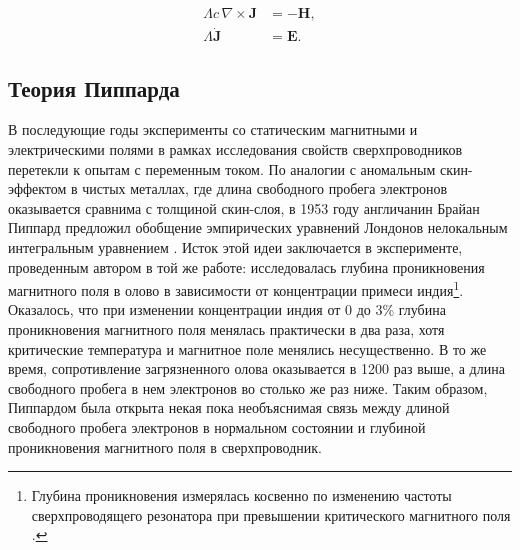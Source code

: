 \documentclass[14pt, a4paper]{extreport}
\numberwithin{equation}{section}
\begin{document}
\begin{align}
\Lambda c\, \nabla \times \mathbf J &= - \mathbf H,\\
\Lambda \dot{\mathbf J} &= \mathbf E.
\end{align}

\subsection{Теория Пиппарда}

В последующие годы эксперименты со статическим магнитными и электрическими полями в рамках исследования свойств сверхпроводников перетекли к опытам с переменным током. По аналогии с аномальным скин-эффектом в чистых металлах, где длина свободного пробега электронов оказывается сравнима с толщиной скин-слоя, в 1953 году англичанин Брайан Пиппард предложил обобщение эмпирических уравнений Лондонов нелокальным интегральным уравнением \cite{pippard1953experimental}. Исток этой идеи заключается в эксперименте, проведенным автором в той же работе: исследовалась глубина проникновения магнитного поля в олово в зависимости от концентрации примеси индия\footnote{Глубина проникновения измерялась косвенно по изменению частоты сверхпроводящего резонатора при превышении критического магнитного поля \cite{pippard1950surface}.}. Оказалось, что при изменении концентрации индия от 0  до 3\% глубина проникновения магнитного поля менялась практически в два раза, хотя критические температура и магнитное поле менялись несущественно. В то же время, сопротивление загрязненного олова оказывается в 1200 раз выше, а длина свободного пробега в нем электронов во столько же раз ниже. Таким образом, Пиппардом была открыта некая пока необъяснимая связь между длиной свободного пробега электронов в нормальном состоянии и глубиной проникновения магнитного поля в сверхпроводник.
\end{document}
